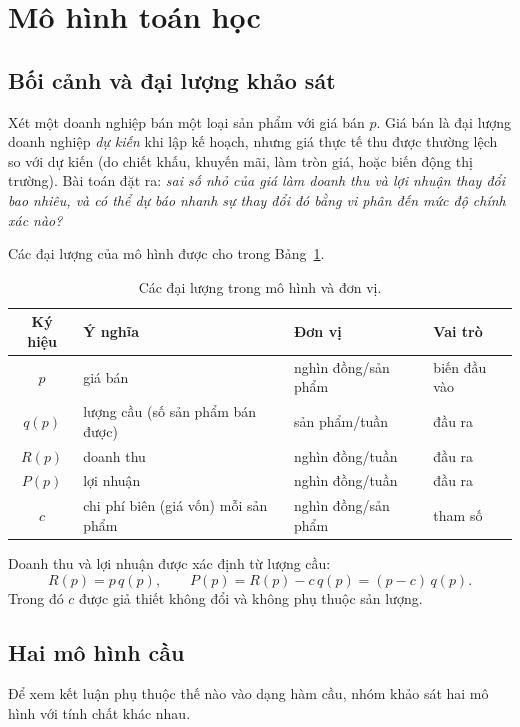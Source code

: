 \section{Mô hình toán học}

\subsection{Bối cảnh và đại lượng khảo sát}
Xét một doanh nghiệp bán một loại sản phẩm với giá bán $p$. Giá bán là đại lượng
doanh nghiệp \emph{dự kiến} khi lập kế hoạch, nhưng giá thực tế thu được thường lệch
so với dự kiến (do chiết khấu, khuyến mãi, làm tròn giá, hoặc biến động thị trường).
Bài toán đặt ra: \emph{sai số nhỏ của giá làm doanh thu và lợi nhuận thay đổi bao
nhiêu, và có thể dự báo nhanh sự thay đổi đó bằng vi phân đến mức độ chính xác nào?}

Các đại lượng của mô hình được cho trong Bảng~\ref{tab:var}.

\begin{table}[h]
\centering
\caption{Các đại lượng trong mô hình và đơn vị.}\label{tab:var}
\begin{tabular}{@{}clll@{}}
\toprule
Ký hiệu & Ý nghĩa & Đơn vị & Vai trò \\
\midrule
$p$ & giá bán & nghìn đồng/sản phẩm & biến đầu vào \\
$q(p)$ & lượng cầu (số sản phẩm bán được) & sản phẩm/tuần & đầu ra \\
$R(p)$ & doanh thu & nghìn đồng/tuần & đầu ra \\
$P(p)$ & lợi nhuận & nghìn đồng/tuần & đầu ra \\
$c$ & chi phí biên (giá vốn) mỗi sản phẩm & nghìn đồng/sản phẩm & tham số \\
\bottomrule
\end{tabular}
\end{table}

Doanh thu và lợi nhuận được xác định từ lượng cầu:
\begin{equation}
R(p) = p\,q(p), \qquad P(p) = R(p) - c\,q(p) = (p-c)\,q(p).
\end{equation}
Trong đó $c$ được giả thiết không đổi và không phụ thuộc sản lượng.

\subsection{Hai mô hình cầu}
Để xem kết luận phụ thuộc thế nào vào dạng hàm cầu, nhóm khảo sát hai mô hình với
tính chất khác nhau.

